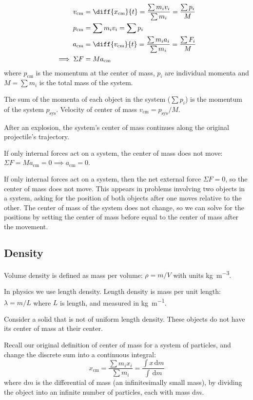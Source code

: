 \documentclass{article}
\newcommand{\theorem}[2]{\begin{tcolorbox}[title={#1},colback=blue!5!white,colframe=blue!75!black,parbox=false] #2 \end{tcolorbox}}
\newcommand{\remark}[2]{\begin{tcolorbox}[title={#1},colback=black!5!white,colframe=black!75!black,parbox=false] #2 \end{tcolorbox}}
\begin{document}
\theorem{Center of mass, velocity, acceleration, momentum and force}{
	\begin{align*}
		v_\text{cm}&=\diff{x_\text{cm}}{t}=\frac{\sum m_iv_i}{\sum m_i}=\frac{\sum p_i}{M} \\
		p_\text{cm}&=\sum m_iv_i=\sum p_i \\
		a_\text{cm}&=\diff{v_\text{cm}}{t}=\frac{\sum m_ia_i}{\sum m_i}=\frac{\sum F_i}{M} \\
		\implies \Sigma F&=Ma_\text{cm}
	\end{align*}
	where $p_\text{cm}$ is the momentum at the center of mass, $p_i$ are individual momenta and $M=\sum m_i$ is the total mass of the system.

	The sum of the momenta of each object in the system ($\sum p_i$) is the  momentum of the system $p_\text{sys}$. Velocity of center of mass $v_\text{cm}=p_\text{sys}/M$.

	After an explosion, the system's center of mass continues along the original projectile's trajectory.

	If only internal forces act on a system, the center of mass does not move: $\Sigma F=Ma_\text{cm}=0 \implies a_\text{cm}=0$.
}

\remark{Center of mass and internal forces}{
	If only internal forces act on a system, then the net external force $\Sigma F=0$, so the center of mass does not move. This appears in problems involving two objects in a system, asking for the position of both objects after one moves relative to the other. The center of mass of the system does not change, so we can solve for the positions by setting the center of mass before equal to the center of mass after the movement.
}

\subsection{Density}

Volume density is defined as mass per volume: $\rho=m/V$ with units \si{\kilo\gram\per\meter^3}.

In physics we use length density. Length density is mass per unit length: $\lambda=m/L$ where $L$ is length, and measured in \si{\kilo\gram\per\meter}.

Consider a solid that is not of uniform length density. These objects do not have its center of mass at their center.

Recall our original definition of center of mass for a system of particles, and change the discrete sum into a continuous integral:
\begin{equation*}
    x_ \text{cm}=\frac{\sum m_ix_i}{\sum m_i}
	=\frac{\int x\,\mathrm{d}m}{\int \,\mathrm{d}m}
\end{equation*}
where $\mathrm{d}m$ is the differential of mass (an infinitesimally small mass), by dividing the object into an infinite number of particles, each with mass $\mathrm{d}m$.
\end{document}
